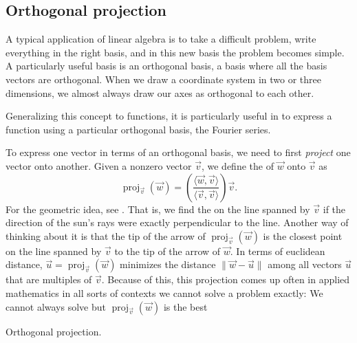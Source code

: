 \subsection{Orthogonal projection}

A typical application of linear algebra is to take a difficult problem,
write everything in the right basis, and in this new basis the problem
becomes simple.  A particularly useful basis is an orthogonal basis,
a basis where all the basis vectors are orthogonal.  When we draw a
coordinate system in two or three dimensions, we almost always draw our axes
as orthogonal to each other.

Generalizing this concept to functions,
it is particularly useful in  to express a
function using a particular orthogonal basis, the Fourier series.

To express one vector in terms of an orthogonal basis, we need to first
\emph{project} one vector onto another.
Given a nonzero vector $\vec{v}$, we define the
\emph{}
of $\vec{w}$ onto $\vec{v}$ as
\begin{equation*}
\operatorname{proj}_{\vec{v}}(\vec{w})
=
\left(
\frac{\langle \vec{w} , \vec{v} \rangle}{ \langle \vec{v} , \vec{v} \rangle}
\right)
\vec{v} .
\end{equation*}
For the geometric idea, see .  That is, we
find the  on the line spanned by $\vec{v}$ if the
direction of the sun's rays
were exactly perpendicular to the line. 
Another way of thinking about it is that the tip of the arrow of
$\operatorname{proj}_{\vec{v}}(\vec{w})$ is the closest point on the line
spanned by $\vec{v}$ to the tip of the arrow of $\vec{w}$.
In terms of euclidean distance, 
$\vec{u} = \operatorname{proj}_{\vec{v}}(\vec{w})$ minimizes the
distance
$\lVert \vec{w} - \vec{u} \rVert$ among all vectors $\vec{u}$ that are
multiples of $\vec{v}$.
Because of this, this projection comes up often in applied
mathematics in all sorts of contexts we cannot solve a problem
exactly: We cannot always solve
but $\operatorname{proj}_{\vec{v}}(\vec{w})$ is the best 

\begin{myfig}
\capstart
{}
\caption{Orthogonal projection.\label{vec-orthoproj:fig}}
\end{myfig}


